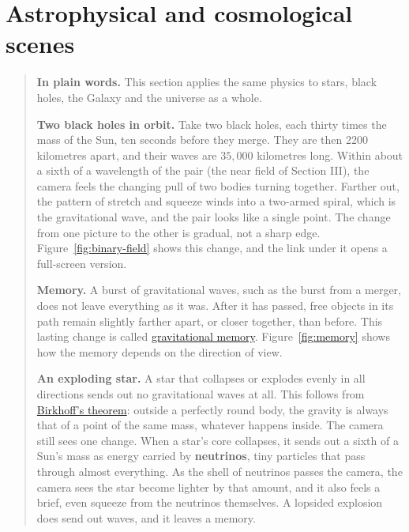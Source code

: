 \section{Astrophysical and cosmological scenes}\label{sec:vistas}

\begin{quote}
\textbf{In plain words.} This section applies the same physics to stars,
black holes, the Galaxy and the universe as a whole.

\textbf{Two black holes in orbit.} Take two black holes, each thirty times the
mass of the Sun, ten seconds before they merge. They are then 2200 kilometres
apart, and their waves are $35{,}000$ kilometres long. Within about a sixth of a
wavelength of the pair (the near field of Section III), the camera feels the
changing pull of two bodies turning together. Farther out, the pattern of
stretch and squeeze winds into a two-armed spiral, which is the gravitational
wave, and the pair looks like a single point. The change from one picture to
the other is gradual, not a sharp edge. Figure~\ref{fig:binary-field} shows this change, and the link under it opens a full-screen version.

\textbf{Memory.} A burst of gravitational waves, such as the burst from a
merger, does not leave everything as it was. After it has passed, free objects
in its path remain slightly farther apart, or closer together, than before.
This lasting change is called
\href{https://en.wikipedia.org/wiki/Gravitational_memory_effect}{gravitational
memory}. Figure~\ref{fig:memory} shows how the memory depends on the direction of view.

\textbf{An exploding star.} A star that collapses or explodes evenly in all
directions sends out no gravitational waves at all. This follows from
\href{https://en.wikipedia.org/wiki/Birkhoff's_theorem_(relativity)}{Birkhoff's
theorem}: outside a perfectly round body, the gravity is always that of a point
of the same mass, whatever happens inside. The camera still sees one change.
When a star's core collapses, it sends out a sixth of a Sun's mass as energy
carried by \textbf{neutrinos}, tiny particles that pass through almost
everything. As the shell of neutrinos passes the camera, the camera sees the
star become lighter by that amount, and it also feels a brief, even squeeze from
the neutrinos themselves. A lopsided explosion does send out waves, and it
leaves a memory.


\end{quote}
